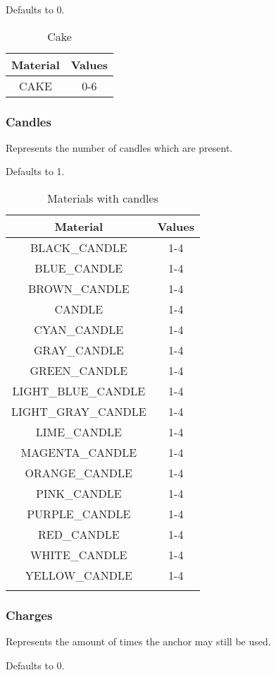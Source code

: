 Defaults to 0.

\begin{table}[H]
	\centering
	\begin{tabular}{ |c|c| }
		\hline
		Material & Values \\
		\hline
		CAKE & 0-6 \\
		\hline
	\end{tabular}
	\caption{Cake}
\end{table}

\subsubsection{Candles}
Represents the number of candles which are present.

Defaults to 1.


\begin{longtable}{ |c|c| }
	\hline
	Material & Values \\
	\hline
	\endhead
	BLACK\_CANDLE & 1-4 \\
	BLUE\_CANDLE & 1-4 \\
	BROWN\_CANDLE & 1-4 \\
	CANDLE & 1-4 \\
	CYAN\_CANDLE & 1-4 \\
	GRAY\_CANDLE & 1-4 \\
	GREEN\_CANDLE & 1-4 \\
	LIGHT\_BLUE\_CANDLE & 1-4 \\
	LIGHT\_GRAY\_CANDLE & 1-4 \\
	LIME\_CANDLE & 1-4 \\
	MAGENTA\_CANDLE & 1-4 \\
	ORANGE\_CANDLE & 1-4 \\
	PINK\_CANDLE & 1-4 \\
	PURPLE\_CANDLE & 1-4 \\
	RED\_CANDLE & 1-4 \\
	WHITE\_CANDLE & 1-4 \\
	YELLOW\_CANDLE & 1-4 \\
	\hline
	\caption{Materials with candles}
\end{longtable}

\subsubsection{Charges}
Represents the amount of times the anchor may still be used.

Defaults to 0.

